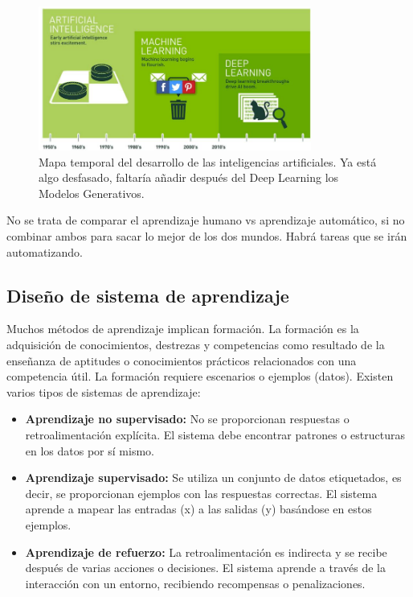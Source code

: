 \begin{figure}[htbp]
\centering
\includegraphics[width = 0.8\textwidth]{figs/ai-timeline.png}
\caption{Mapa temporal del desarrollo de las inteligencias artificiales. Ya está algo desfasado, faltaría añadir después del Deep Learning los Modelos Generativos.}
\end{figure}

No se trata de comparar el aprendizaje humano vs aprendizaje automático, si no combinar ambos para sacar lo mejor de los dos mundos. Habrá tareas que se irán automatizando.

\subsection{Diseño de sistema de aprendizaje}
Muchos métodos de aprendizaje implican formación. La formación es la adquisición de conocimientos, destrezas y competencias como resultado de la enseñanza de aptitudes o conocimientos prácticos relacionados con una competencia útil. La formación requiere escenarios o ejemplos (datos). Existen varios tipos de sistemas de aprendizaje:
\begin{itemize}
\item \textbf{Aprendizaje no supervisado:} No se proporcionan respuestas o retroalimentación explícita. El sistema debe encontrar patrones o estructuras en los datos por sí mismo.
\item \textbf{Aprendizaje supervisado:} Se utiliza un conjunto de datos etiquetados, es decir, se proporcionan ejemplos con las respuestas correctas. El sistema aprende a mapear las entradas (x) a las salidas (y) basándose en estos ejemplos.
\item \textbf{Aprendizaje de refuerzo:} La retroalimentación es indirecta y se recibe después de varias acciones o decisiones. El sistema aprende a través de la interacción con un entorno, recibiendo recompensas o penalizaciones.
\end{itemize}

